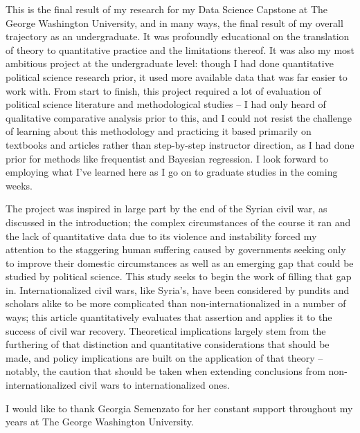 \documentclass{article}
\begin{document}
\begin{preface}
        This is the final result of my research for my Data Science Capstone at The George Washington University, and in many ways, the final result of my overall trajectory as an undergraduate. It was profoundly educational on the translation of theory to quantitative practice and the limitations thereof. It was also my most ambitious project at the undergraduate level: though I had done quantitative political science research prior, it used more available data that was far easier to work with. From start to finish, this project required a lot of evaluation of political science literature and methodological studies -- I had only heard of qualitative comparative analysis prior to this, and I could not resist the challenge of learning about this methodology and practicing it based primarily on textbooks and articles rather than step-by-step instructor direction, as I had done prior for methods like frequentist and Bayesian regression. I look forward to employing what I've learned here as I go on to graduate studies in the coming weeks.

        The project was inspired in large part by the end of the Syrian civil war, as discussed in the introduction; the complex circumstances of the course it ran and the lack of quantitative data due to its violence and instability forced my attention to the staggering human suffering caused by governments seeking only to improve their domestic circumstances as well as an emerging gap that could be studied by political science. This study seeks to begin the work of filling that gap in. Internationalized civil wars, like Syria's, have been considered by pundits and scholars alike to be more complicated than non-internationalized in a number of ways; this article quantitatively evaluates that assertion and applies it to the success of civil war recovery. Theoretical implications largely stem from the furthering of that distinction and quantitative considerations that should be made, and policy implications are built on the application of that theory -- notably, the caution that should be taken when extending conclusions from non-internationalized civil wars to internationalized ones. 
\end{preface}

\vspace{1cm}

\begin{acknowledgements}
I would like to thank Georgia Semenzato for her constant support throughout my years at The George Washington University.
\end{acknowledgements}
\end{document}
